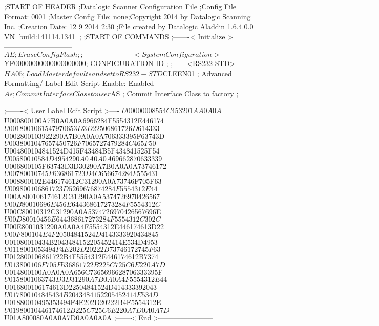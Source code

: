 ;START OF HEADER
;Datalogic Scanner Configuration File
;Config File Format: 0001
;Master Config File: none;Copyright 2014 by Datalogic Scanning Inc.
;Creation Date: 12 9 2014 2:30
;File created by Datalogic Aladdin 1.6.4.0.0 VN [build:141114.1341]
;
;START OF COMMANDS
;-------< Initialize >-----------------------------
$AE                 ; Erase Config Flash
;
;-------< System Configuration >-------------------------------
$YF00000000000000000000; CONFIGURATION ID
;
;------<RS232-STD>------
$HA05               ; Load Master defaults and set to RS232-STD
$CLEEN01            ; Advanced Formatting/ Label Edit Script Enable: Enabled
$As                 ; Commit Interface Class to user
$AS                 ; Commit Interface Class to factory
;

;-------< User Label Edit Script >----
$U00000008554C453201AA0A0A
$U000800100A7B0A0A0A6966284F5554312E446174
$U0018001061547970653D3D22506861726D614333
$U002800103922290A7B0A0A0A706333395F63743D
$U0038001047657450726F7065727479284C465F50
$U004800104841524D415F43484B5F434841525F54
$U00580010584D4954290A0A0A0A69662870633339
$U006800105F63743D3D30290A7B0A0A0A73746172
$U00780010745F636861723D4C656674284F555431
$U008800102E446174612C31290A0A73746F705F63
$U009800106861723D5269676874284F5554312E44
$U00A800106174612C31290A0A5374726970426567
$U00B80010696E456E644368617273284F5554312C
$U00C80010312C31290A0A5374726970426567696E
$U00D80010456E644368617273284F5554312C302C
$U00E8001031290A0A0A4F5554312E446174613D22
$U00F800104E4F20504841524D4143333920434845
$U01080010434B2043484152205452414E534D4953
$U0118001053494F4E202D20222B73746172745F63
$U012800106861722B4F5554312E446174612B7374
$U013800106F705F636861722B225C725C6E220A7D
$U014800100A0A0A0A656C7365696628706333395F
$U0158001063743D3D31290A7B0A0A4F5554312E44
$U016800106174613D22504841524D414333392043
$U017800104845434B2043484152205452414E534D
$U01880010495353494F4E202D20222B4F5554312E
$U01980010446174612B225C725C6E220A7D0A0A7D
$U01A800080A0A0A7D0A0A0A0A
;------< End >-----------------------
